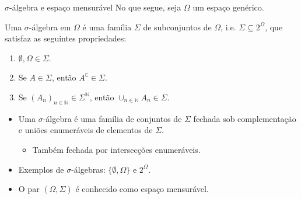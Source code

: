 \documentclass[11pt]{beamer}
\begin{document}
\begin{frame}{$\sigma$-álgebra e espaço mensurável}
	No que segue, seja $\Omega$ um espaço genérico.
\begin{definition}
	Uma $\sigma$-álgebra em $\Omega$ é uma família $\Sigma$ de subconjuntos de  $\Omega$, i.e. $\Sigma \subseteq 2^\Omega$, que satisfaz as seguintes propriedades:
	\begin{enumerate}
		\item $\emptyset, \Omega \in \Sigma$.
		\item Se $A \in \Sigma$, então $A^\complement \in \Sigma$.
		\item Se $(A_n)_{n \in \mathbb{N} }\in \Sigma^\mathbb{N}$, então $\cup_{n \in \mathbb{N}}A_n \in \Sigma$. 
	\end{enumerate}

\end{definition}
\vspace{1em}
\begin{itemize}
	\item 	Uma $\sigma$-álgebra é uma família de conjuntos de  $\Sigma$ fechada sob complementação e uniões enumeráveis de elementos de $\Sigma$.
	\begin{itemize}
		\item Também fechada por intersecções enumeráveis.
	\end{itemize}
	\item Exemplos de $\sigma$-álgebras: $\{\emptyset, \Omega\}$ e $2^\Omega$.
	\item O par $(\Omega, \Sigma)$ é conhecido como {\color{blue}espaço mensurável}.
\end{itemize}

\end{frame}
\end{document}
